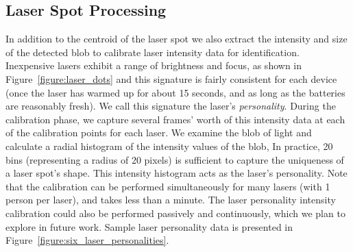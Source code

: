 \documentclass[review]{vgtc}                 %
\begin{document}
\subsection{Laser Spot Processing}

In addition to the centroid of the laser spot we also extract the
intensity and size of the detected blob
to calibrate laser intensity data for identification.  Inexpensive
lasers exhibit a range of brightness and focus, as shown in
Figure~\ref{figure:laser_dots} and this signature is fairly consistent
for each device (once the laser has warmed up for about 15 seconds,
and as long as the batteries are reasonably fresh). We call this
signature the laser's \textit{personality}.
During the calibration phase, we capture several frames' worth of this
intensity data at each of the calibration points for each laser. We
examine the blob of light and calculate a radial histogram of the
intensity values of the blob, In practice, 20 bins (representing a
radius of 20 pixels) is sufficient to capture the uniqueness of a
laser spot's shape.  This intensity histogram acts as the laser's
personality.
Note that the calibration can be performed simultaneously for many
lasers (with 1 person per laser), and takes less than a minute.  The
laser personality intensity calibration could also be performed
passively and continuously, which we plan to explore in future work.
Sample laser personality data is presented in
Figure~\ref{figure:six_laser_personalities}.
\end{document}
